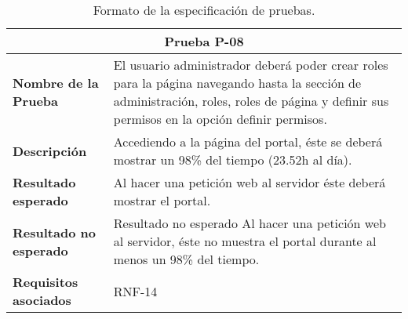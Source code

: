 \begin{table}[h]
\begin{center}
\begin{tabular}{ l l }
\multicolumn{2}{c}{Prueba P-08} \\ \hline
\textbf{Nombre de la Prueba} & El usuario administrador deberá poder crear roles para la página navegando hasta la sección de administración, roles, roles de página y definir sus permisos en la opción definir permisos. \\
\textbf{Descripción} & Accediendo a la página del portal, éste se deberá mostrar un 98\% del tiempo (23.52h al día). \\
\textbf{Resultado esperado} & Al hacer una petición web al servidor éste deberá mostrar el portal.\\
\textbf{Resultado no esperado} & Resultado no esperado	Al hacer una petición web al servidor, éste no muestra el portal durante al menos un 98\% del tiempo. \\
\textbf{Requisitos asociados} & RNF-14 \\ \hline
\end{tabular}
\caption{Formato de la especificación de pruebas.}
\label{tab:P8}
\end{center}
\end{table}
